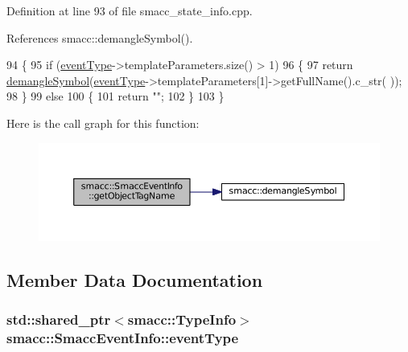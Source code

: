 Definition at line 93 of file smacc\+\_\+state\+\_\+info.\+cpp.



References smacc\+::demangle\+Symbol().


\begin{DoxyCode}
94 \{
95     \textcolor{keywordflow}{if} (\hyperlink{structsmacc_1_1SmaccEventInfo_a42df97fc9a9a817ca841427358002930}{eventType}->templateParameters.size() > 1)
96     \{
97         \textcolor{keywordflow}{return} \hyperlink{namespacesmacc_a458f5e70d468824fbcd66cc7729deaa8}{demangleSymbol}(\hyperlink{structsmacc_1_1SmaccEventInfo_a42df97fc9a9a817ca841427358002930}{eventType}->templateParameters[1]->getFullName().c\_str(
      ));
98     \}
99     \textcolor{keywordflow}{else}
100     \{
101         \textcolor{keywordflow}{return} \textcolor{stringliteral}{""};
102     \}
103 \}
\end{DoxyCode}


Here is the call graph for this function\+:
\nopagebreak
\begin{figure}[H]
\begin{center}
\leavevmode
\includegraphics[width=350pt]{structsmacc_1_1SmaccEventInfo_a0aa5d15822e7642079f375ee0f4ff096_cgraph}
\end{center}
\end{figure}




\subsection{Member Data Documentation}
\subsubsection[{\texorpdfstring{event\+Type}{eventType}}]{\setlength{\rightskip}{0pt plus 5cm}std\+::shared\+\_\+ptr$<${\bf smacc\+::\+Type\+Info}$>$ smacc\+::\+Smacc\+Event\+Info\+::event\+Type}\hypertarget{structsmacc_1_1SmaccEventInfo_a42df97fc9a9a817ca841427358002930}{}\label{structsmacc_1_1SmaccEventInfo_a42df97fc9a9a817ca841427358002930}


